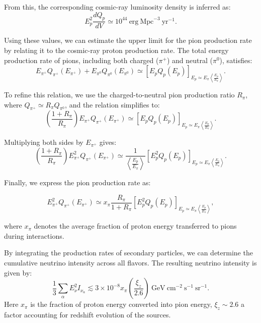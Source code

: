 From this, the corresponding cosmic-ray luminosity density is inferred as:
\begin{equation}
E_p^2 \frac{dQ_p}{dV} \simeq 10^{44}~\text{erg}~\text{Mpc}^{-3}~\text{yr}^{-1}.
\end{equation}

Using these values, we can estimate the upper limit for the pion production rate by relating it to the cosmic-ray proton production rate. The total energy production rate of pions, including both charged (\(\pi^+\)) and neutral (\(\pi^0\)), satisfies:
\begin{equation}
E_{\pi^+} Q_{\pi^+}(E_{\pi^+}) + E_{\pi^0} Q_{\pi^0}(E_{\pi^0}) \simeq \left[E_p Q_p(E_p)\right]_{E_p \simeq E_{\pi} \left\langle \frac{E_p}{E_{\pi}} \right\rangle}.
\end{equation}

To refine this relation, we use the charged-to-neutral pion production ratio \(R_\pi\), where \(Q_{\pi^+} \simeq R_\pi Q_{\pi^0}\), and the relation simplifies to:
\begin{equation}
\left(\frac{1 + R_\pi}{R_\pi}\right) E_{\pi^+} Q_{\pi^+}(E_{\pi^+}) \simeq \left[E_p Q_p(E_p)\right]_{E_p \simeq E_{\pi} \left\langle \frac{E_p}{E_{\pi}} \right\rangle}.
\end{equation}

Multiplying both sides by \(E_{\pi^+}\) gives:
\begin{equation}
\left(\frac{1 + R_\pi}{R_\pi}\right) E^2_{\pi^+} Q_{\pi^+}(E_{\pi^+}) \simeq \frac{1}{\left\langle \frac{E_p}{E_{\pi}} \right\rangle} \left[E^2_p Q_p(E_p)\right]_{E_p \simeq E_{\pi} \left\langle \frac{E_p}{E_{\pi}} \right\rangle}.
\end{equation}

Finally, we express the pion production rate as:
\begin{remark}
\begin{equation}
E^2_{\pi^+} Q_{\pi^+}(E_{\pi^+}) \simeq x_\pi \frac{R_\pi}{1 + R_\pi} \left[E^2_p Q_p(E_p)\right]_{E_p \simeq E_{\pi} \left\langle \frac{E_p}{E_{\pi}} \right\rangle},
\end{equation}
\end{remark}
where \(x_\pi\) denotes the average fraction of proton energy transferred to pions during interactions.

By integrating the production rates of secondary particles, we can determine the cumulative neutrino intensity across all flavors. The resulting neutrino intensity is given by:
\begin{equation}
\frac{1}{3} \sum_\alpha E_\nu^2 I_{\nu_\alpha} \lesssim 3 \times 10^{-8} x_\pi \left(\frac{\xi_z}{2.6}\right)~\text{GeV}~\text{cm}^{-2}~\text{s}^{-1}~\text{sr}^{-1}.
\end{equation}
Here \(x_\pi\) is the fraction of proton energy converted into pion energy, \(\xi_z \sim 2.6\) a factor accounting for redshift evolution of the sources.  

